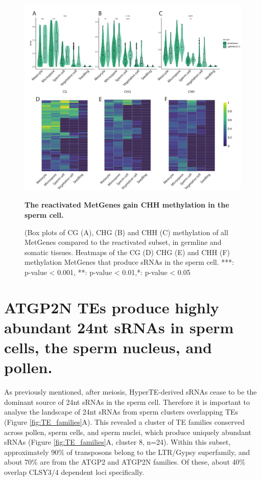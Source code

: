 \begin{figure}[htbp!] 
\centering    
    \includegraphics[width=1\textwidth]{Chapter2/Figs/Figure12_Reactivated_MetGenes_methylation.pdf}
\caption{\textbf{The reactivated MetGenes gain CHH methylation in the sperm cell.}}
\label{fig:boxplot_MetGene_methylation}
\captionsetup{font=small}
    \caption*{(Box plots of CG (A), CHG (B) and CHH (C) methylation of all MetGenes compared to the reactivated subset, in germline and somatic tissues. Heatmaps of the CG (D) CHG (E) and CHH (F) methylation MetGenes that produce sRNAs in the sperm cell. ***: p-value < 0.001, **: p-value < 0.01,*: p-value < 0.05}
\end{figure}

\section{ATGP2N TEs produce highly abundant 24nt sRNAs in sperm cells, the sperm nucleus, and pollen.}

As previously mentioned, after meiosis, HyperTE-derived sRNAs cease to be the dominant source of 24nt sRNAs in the sperm cell. Therefore it is important to analyse the landscape of 24nt sRNAs from sperm clusters overlapping TEs (Figure \ref{fig:TE_families}A). This revealed a cluster of TE families conserved across pollen, sperm cells, and sperm nuclei, which produce uniquely abundant sRNAs (Figure \ref{fig:TE_families}A, cluster 8, n=24). Within this subset, approximately 90\% of transposons belong to the LTR/Gypsy superfamily, and about 70\% are from the ATGP2 and ATGP2N families. Of these, about 40\% overlap CLSY3/4 dependent loci specifically.

